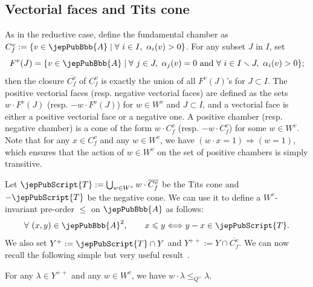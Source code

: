 \subsection{Vectorial faces and Tits cone}
As in the reductive case, define the fundamental chamber as $C_f^v:=\{v\in\jepPubBbb{A}\mid\forall\ i\in I,\ \alpha_i(v)>0\}$. For any subset $J$ in $I$, set
\[
F^v(J)=\{v\in\jepPubBbb{A}\mid\forall\ j\in J,\ \alpha_j(v)=0\text{ and }\forall\ i\in I\smallsetminus J,\ \alpha_i(v)>0\};
\]
then the closure $\overline{C_f^v}$ of $C_f^v$ is exactly the union of all $F^v(J)$'s for $J\subset I$. The positive vectorial faces (resp. negative vectorial faces) are defined as the sets $w\cdot F^v(J)$ (resp. $-w\cdot F^v(J)$) for $w\in W^v$ and $J\subset I$, and a vectorial face is either a positive vectorial face or a negative one. A positive chamber (resp. negative chamber) is a cone of the form $w\cdot C_f^v$ (resp. $-w\cdot C_f^v$) for some $w\in W^v$. Note that for any $x\in C_f^v$ and any $w\in W^v$, we have $(w\cdot x=1)\Rightarrow(w=1)$, which ensures that the action of $w\in W^v$ on the set of positive chambers is simply transitive.

Let $\jepPubScript{T}:=\bigcup_{w\in W^v}w\cdot\overline{C_f^v}$ be the Tits cone and $-\jepPubScript{T}$ be the negative cone. We can use it to define a $W^v$-invariant pre-order $\leqslant$ on $\jepPubBbb{A}$ as follows:
\[
\forall\ (x,y)\in\jepPubBbb{A}^2,\qquad x\leqslant y\Longleftrightarrow y-x\in\jepPubScript{T}.
\]
We also set $Y^+:=\jepPubScript{T}\cap Y$ and $Y^{++}:=Y\cap\overline{C_f^v}$. We can now recall the following simple but very useful result~\cite[Lem.~2.4 a)]{jep88refGR14}.
\begin{lemma}\label{jep88localLemma2_1}
For any $\lambda\in Y^{++}$ and any $w\in W^v$, we have $w\cdot\lambda\leqslant_{Q^{\scriptscriptstyle\vee}}\lambda$.
\end{lemma}
